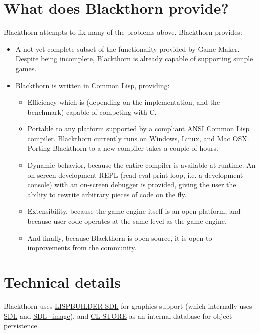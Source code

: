 \documentclass[letterpaper]{article}
\begin{document}
\section{What does Blackthorn provide?}

Blackthorn attempts to fix many of the problems above. Blackthorn provides:

\begin{itemize}
    \item A not-yet-complete subset of the functionality provided by Game Maker. Despite being incomplete, Blackthorn is already capable of supporting simple games.
    \item Blackthorn is written in Common Lisp, providing:
    \begin{itemize}
          \item Efficiency which is (depending on the implementation, and the benchmark) capable of competing with C.
          \item Portable to any platform supported by a compliant ANSI Common Lisp compiler. Blackthorn currently runs on Windows, Linux, and Mac OSX. Porting Blackthorn to a new compiler takes a couple of hours.
          \item Dynamic behavior, because the entire compiler is available at runtime. An on-screen development REPL (read-eval-print loop, i.e. a development console) with an on-screen debugger is provided, giving the user the ability to rewrite arbitrary pieces of code on the fly.
          \item Extensibility, because the game engine itself is an open platform, and because user code operates at the same level as the game engine.
          \item And finally, because Blackthorn is open source, it is open to improvements from the community.
    \end{itemize}
\end{itemize}

\section{Technical details}

Blackthorn uses \href{http://code.google.com/p/lispbuilder/}{LISPBUILDER-SDL} for graphics support (which internally uses \href{http://www.libsdl.org/}{SDL} and \href{http://www.libsdl.org/projects/SDL_image/}{SDL\_image}), and \href{http://common-lisp.net/project/cl-store/}{CL-STORE} as an internal database for object persistence.
\end{document}
